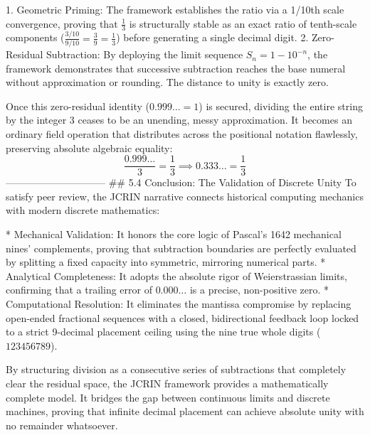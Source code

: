    1. Geometric Priming: The framework establishes the ratio via a 1/10th scale convergence, proving that $\frac{1}{3}$ is structurally stable as an exact ratio of tenth-scale components ($\frac{3/10}{9/10} = \frac{3}{9} = \frac{1}{3}$) before generating a single decimal digit.
   2. Zero-Residual Subtraction: By deploying the limit sequence $S_n = 1 - 10^{-n}$, the framework demonstrates that successive subtraction reaches the base numeral without approximation or rounding. The distance to unity is exactly zero.

Once this zero-residual identity ($0.999\dots = 1$) is secured, dividing the entire string by the integer 3 ceases to be an unending, messy approximation. It becomes an ordinary field operation that distributes across the positional notation flawlessly, preserving absolute algebraic equality:
$$\frac{0.999\dots}{3} = \frac{1}{3} \implies 0.333\dots = \frac{1}{3}$$ 
------------------------------
## 5.4 Conclusion: The Validation of Discrete Unity
To satisfy peer review, the JCRIN narrative connects historical computing mechanics with modern discrete mathematics:

* Mechanical Validation: It honors the core logic of Pascal’s 1642 mechanical nines' complements, proving that subtraction boundaries are perfectly evaluated by splitting a fixed capacity into symmetric, mirroring numerical parts.
* Analytical Completeness: It adopts the absolute rigor of Weierstrassian limits, confirming that a trailing error of $0.000\dots$ is a precise, non-positive zero.
* Computational Resolution: It eliminates the mantissa compromise by replacing open-ended fractional sequences with a closed, bidirectional feedback loop locked to a strict 9-decimal placement ceiling using the nine true whole digits ($123456789$).

By structuring division as a consecutive series of subtractions that completely clear the residual space, the JCRIN framework provides a mathematically complete model. It bridges the gap between continuous limits and discrete machines, proving that infinite decimal placement can achieve absolute unity with no remainder whatsoever.
